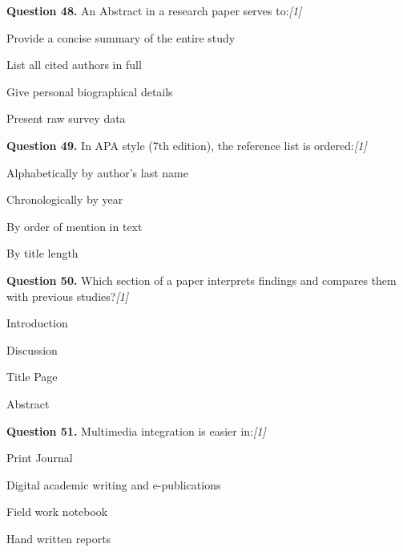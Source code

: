 \documentclass[11pt,a4paper]{article}
\newcommand{\pts}[1]{\hfill   \textit{[#1]}}
\begin{document}
\medskip




\noindent   \textbf{Question 48.} An Abstract in a research paper serves to:\pts{1}

\begin{parts}
  \item Provide a concise summary of the entire study
  \item List all cited authors in full
  \item Give personal biographical details
  \item Present raw survey data
\end{parts}

\medskip




\noindent   \textbf{Question 49.} In APA style (7th edition), the reference list is ordered:\pts{1}

\begin{parts}
  \item Alphabetically by author's last name
  \item Chronologically by year
  \item By order of mention in text
  \item By title length
\end{parts}

\medskip




\noindent   \textbf{Question 50.} Which section of a paper interprets findings and compares them with previous studies?\pts{1}

\begin{parts}
  \item Introduction
  \item Discussion
  \item Title Page
  \item Abstract
\end{parts}

\medskip




\noindent   \textbf{Question 51.} Multimedia integration is easier in:\pts{1}

\begin{parts}
  \item Print Journal
  \item Digital academic writing and e-publications
  \item Field work notebook
  \item Hand written reports
\end{parts}
\end{document}
